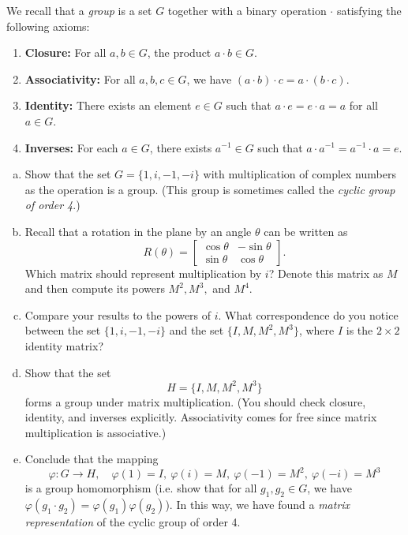 \documentclass[11pt,letterpaper]{article}
\begin{document}
We recall that a \emph{group} is a set $G$ together with a binary operation $\cdot$ satisfying the following axioms:
\begin{enumerate}
    \item \textbf{Closure:} For all $a,b \in G$, the product $a \cdot b \in G$.
    \item \textbf{Associativity:} For all $a,b,c \in G$, we have $(a \cdot b) \cdot c = a \cdot (b \cdot c)$.
    \item \textbf{Identity:} There exists an element $e \in G$ such that $a \cdot e = e \cdot a = a$ for all $a \in G$.
    \item \textbf{Inverses:} For each $a \in G$, there exists $a^{-1} \in G$ such that $a \cdot a^{-1} = a^{-1} \cdot a = e$.
\end{enumerate}

\begin{enumerate}[(a)]
    \item Show that the set $G = \{1, i, -1, -i\}$ with multiplication of complex numbers as the operation is a group. (This group is sometimes called the \emph{cyclic group of order 4}.)

    \item Recall that a rotation in the plane by an angle $\theta$ can be written as
    \[
        R(\theta) = \begin{bmatrix}\cos\theta & -\sin\theta \\ \sin\theta & \cos\theta \end{bmatrix}.
    \]
    Which matrix should represent multiplication by $i$? Denote this matrix as $M$ and then compute its powers $M^2, M^3,$ and $M^4$.

    \item Compare your results to the powers of $i$. What correspondence do you notice between the set $\{1, i, -1, -i\}$ and the set $\{I, M, M^2, M^3\}$, where $I$ is the $2\times 2$ identity matrix?

    \item Show that the set
    \[
        H = \{I, M, M^2, M^3\}
    \]
    forms a group under matrix multiplication. (You should check closure, identity, and inverses explicitly. Associativity comes for free since matrix multiplication is associative.)

    \item Conclude that the mapping
    \[
        \varphi: G \to H, \quad \varphi(1) = I,\ \varphi(i) = M,\ \varphi(-1) = M^2,\ \varphi(-i) = M^3
    \]
    is a group homomorphism (i.e. show that for all $g_1,g_2 \in G$, we have $\varphi(g_1 \cdot g_2)=\varphi(g_1)\varphi(g_2)$). In this way, we have found a \emph{matrix representation} of the cyclic group of order 4.
\end{enumerate}
\end{document}

